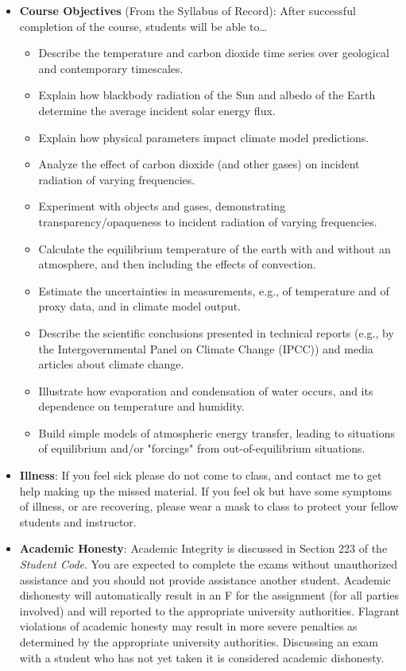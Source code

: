 \documentclass{article}
\begin{document}
\begin{itemize}
\item[] {\bf Course Objectives} (From the Syllabus of Record): After successful completion of the course, students will be able to\ldots
	\begin{itemize}
	\item Describe the temperature and carbon dioxide time series over geological and contemporary timescales. 
	\item Explain how blackbody radiation of the Sun and albedo of the Earth determine the average incident solar energy flux. 
	\item Explain how physical parameters impact climate model predictions. 
	\item Analyze the effect of carbon dioxide (and other gases) on incident radiation of varying frequencies. 
	\item Experiment with objects and gases, demonstrating transparency/opaqueness to incident radiation of varying frequencies. 
	\item Calculate the equilibrium temperature of the earth with and without an atmosphere, and then including the effects of convection. 
	\item Estimate the uncertainties in measurements, e.g., of temperature and of proxy data, and in climate model output. 
	\item Describe the scientific conclusions presented in technical reports (e.g., by the Intergovernmental Panel on Climate Change (IPCC)) and media articles about climate change.
	\item Illustrate how evaporation and condensation of water occurs, and its dependence on temperature and humidity. 
	\item Build simple models of atmospheric energy transfer, leading to situations of equilibrium and/or "forcings" from out-of-equilibrium situations.
	\end{itemize}

\item[] {\bf Illness}: If you feel sick please do not come to class, and contact me to get help making up the missed material.  If you feel ok but have some symptoms of illness, or are recovering, please wear a mask to class to protect your fellow students and instructor.

\item[] {\bf Academic Honesty}: Academic Integrity is discussed in Section 223 of the {\em Student Code}. You are expected to complete the exams without unauthorized assistance and you should not provide assistance another student. Academic dishonesty will automatically result in an F for the assignment (for all parties involved) and will reported to the appropriate university authorities.  Flagrant violations of academic honesty may result in more severe penalties as determined by the appropriate university authorities.  Discussing an exam with a student who has not yet taken it is considered academic dishonesty.


\end{itemize}
\end{document}
